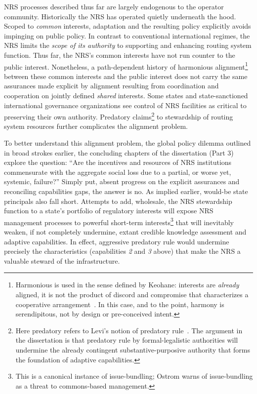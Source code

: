 \documentclass[12pt,journal,compsoc,letterpaper,onecolumn,twoside]{IEEEtran}
\begin{document}
NRS processes described thus far are largely endogenous to the
operator community.
%
Historically the NRS has operated quietly underneath the
hood. 
%
Scoped to \emph{common}
interests, adaptation and the resulting policy explicitly avoids impinging on public policy.
%
In contrast to conventional international regimes, the NRS limits
the \emph{scope of its authority} to supporting and enhancing routing
system function.
%
Thus far, the NRS's common interests have not run counter to the
public interest.
%
Nonetheless, a path-dependent history of harmonious
alignment\footnote{Harmonious is used in the sense defined by
  Keohane: interests are \emph{already} aligned, it is not the product of
  discord and 
  compromise that characterizes a cooperative
  arrangement~\citeyear[pp. 12, 51--57]{keohane2005ah}.  In this case,
  and to the point, harmony is serendipitous, not by design or
  pre-conceived intent.} between  
these common interests and the public interest does not carry the
same assurances made explicit by alignment resulting from coordination and
cooperation on jointly defined \emph{shared} interests.
%
Some states and state-sanctioned international
governance organizations see control of NRS facilities as critical to
preserving their own authority. 
%
Predatory claims\footnote{Here predatory refers to Levi's notion of
  predatory rule~\citeyear[see Chapter 2]{levi1989rule}.  The argument
  in the dissertation is 
  that predatory 
  rule by formal-legalistic authorities will undermine the already
  contingent substantive-purposive authority that forms the foundation
  of adaptive capabilities.} to stewardship of routing
system resources further 
complicates the alignment problem.  


To better understand this alignment problem, the global policy dilemma
outlined in broad strokes earlier, the concluding
chapters of the dissertation (Part 3) explore the question: ``Are the
incentives and resources of NRS 
institutions commensurate with the aggregate social loss due to a
partial, or worse yet, systemic, failure?''
%
Simply put, absent progress on the explicit assurances and reconciling
capabilities gaps, the
answer is no.
%
As implied earlier, would-be state principals also fall short.  
%
%
Attempts to add, wholesale, the NRS stewardship function to a state's
portfolio of 
regulatory interests will expose NRS management processes to
powerful short-term interests\footnote{This is a canonical instance of
issue-bundling; Ostrom warns of issue-bundling as a threat to commons-based
management.} that will inevitably weaken, if not 
completely undermine, extant credible knowledge assessment and adaptive
capabilities.  
%
In effect, aggressive predatory rule would undermine 
precisely the characteristics (capabilities \emph{2} and \emph{3}
above) that make 
the NRS a valuable 
steward of the infrastructure.
\end{document}
